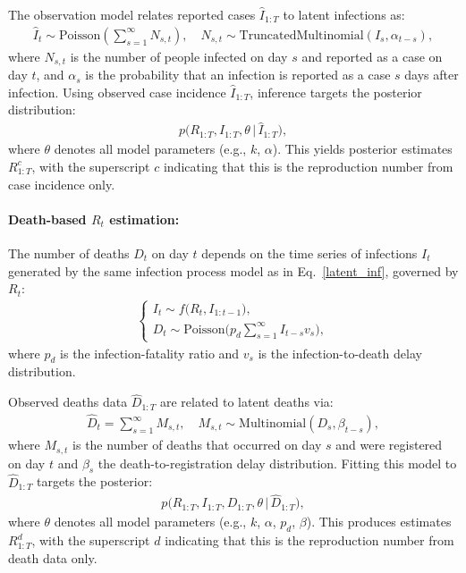 \documentclass{article}
\begin{document}
The observation model relates reported cases $\widehat{I}_{1:T}$ to latent infections as:
\begin{align}\label{obs_inf}
\widehat{I}_t \sim \mathrm{Poisson}\left( \sum_{s=1}^\infty N_{s,t} \right), \quad N_{s,t} \sim \mathrm{TruncatedMultinomial}(I_s, \alpha_{t-s}),
\end{align}
where $N_{s,t}$ is the number of people infected on day $s$ and reported as a case on day $t$, and $\alpha_s$ is the probability that an infection is reported as a case $s$ days after infection. Using observed case incidence $\widehat{I}_{1:T}$, inference targets the posterior distribution:
\begin{align}
p\big(R_{1:T}, I_{1:T}, \theta \,\big|\, \widehat{I}_{1:T}\big),
\end{align}
where $\theta$ denotes all model parameters (e.g., $k$, $\alpha$). This yields posterior estimates $R_{1:T}^{c}$, with the superscript $c$ indicating that this is the reproduction number from case incidence only.

\paragraph{Death-based $R_{t}$ estimation:}
The number of deaths $D_t$ on day $t$ depends on the time series of infections $I_{t}$ generated by the same infection process model as in Eq.~\eqref{latent_inf}, governed by $R_{t}$:
\begin{align}\label{latent_death}
\begin{cases}
I_t \sim f\big(R_t, I_{1:t-1}\big),\\[4pt]
D_t \sim \mathrm{Poisson}\!\Big( p_d \sum_{s=1}^\infty I_{t-s} v_s \Big),
\end{cases}
\end{align}
where $p_d$ is the infection-fatality ratio and $v_s$ is the infection-to-death delay distribution.

Observed deaths data $\widehat{D}_{1:T}$ are related to latent deaths via:
\begin{align}\label{obs_death}
\widehat{D}_t = \sum_{s=1}^\infty M_{s,t}, \quad M_{s,t} \sim \mathrm{Multinomial}(D_s, \beta_{t-s}),
\end{align}
where $M_{s,t}$ is the number of deaths that occurred on day $s$ and were registered on day $t$ and $\beta_s$ the death-to-registration delay distribution.  
Fitting this model to $\widehat{D}_{1:T}$ targets the posterior:
\begin{align}
p\big(R_{1:T}, I_{1:T}, D_{1:T}, \theta \,\big|\, \widehat{D}_{1:T}\big),
\end{align}
where $\theta$ denotes all model parameters (e.g., $k$, $\alpha$, $p_d$, $\beta$).  
This produces estimates $R_{1:T}^d$, with the superscript $d$ indicating that this is the reproduction number from death data only.
\end{document}
